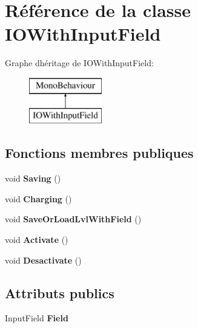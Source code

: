\hypertarget{class_i_o_with_input_field}{}\section{Référence de la classe I\+O\+With\+Input\+Field}
\label{class_i_o_with_input_field}
Graphe d\textquotesingle{}héritage de I\+O\+With\+Input\+Field\+:\begin{figure}[H]
\begin{center}
\leavevmode
\includegraphics[height=2.000000cm]{class_i_o_with_input_field}
\end{center}
\end{figure}
\subsection*{Fonctions membres publiques}
\begin{DoxyCompactItemize}
\item 
\mbox{\label{class_i_o_with_input_field_a5d6a1f8b94ecea4fc82fd97f297e0d77}} 
void {\bfseries Saving} ()
\item 
\mbox{\label{class_i_o_with_input_field_a3f02c4fda3cc9bf49605a35a08c78fcd}} 
void {\bfseries Charging} ()
\item 
\mbox{\label{class_i_o_with_input_field_a02e95196cec3127f0b8977bd9a60f159}} 
void {\bfseries Save\+Or\+Load\+Lvl\+With\+Field} ()
\item 
\mbox{\label{class_i_o_with_input_field_a7c92df1bf7e5e7f42bfd7bcb1afcba04}} 
void {\bfseries Activate} ()
\item 
\mbox{\label{class_i_o_with_input_field_a59aa447c2460a8e44367d10ca18aa2f1}} 
void {\bfseries Desactivate} ()
\end{DoxyCompactItemize}
\subsection*{Attributs publics}
\begin{DoxyCompactItemize}
\item 
\mbox{\label{class_i_o_with_input_field_a035182cfc25f0f5f895b19555f68f11f}} 
Input\+Field {\bfseries Field}
\end{DoxyCompactItemize}
